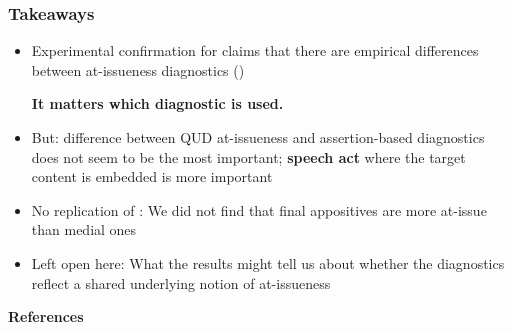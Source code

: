 \documentclass[compress, xcolor = dvipsnames, aspectratio=169]{beamer}
\begin{document}
	\begin{frame}\frametitle{Takeaways}
	
		\begin{itemize}[<+->]
			\item Experimental confirmation for claims that there are empirical differences between at-issueness diagnostics (\citealt{snider_anaphoric_2017,snider_at-issuenessne_2017,snider_distinguishing_2018,koev_notions_2018,faller_discourse_2019,korotkova_evidential_2020})
			\begin{center}
				\textbf{It matters which diagnostic is used.}\bigskip
			\end{center}


			\item But: difference between QUD at-issueness and assertion-based diagnostics does not seem to be the most important; \textbf{speech act} where the target content is embedded is more important \medskip

			\item No replication of \citealt{syrett_experimental_2015}: We did not find that final appositives are more at-issue than medial ones
			\medskip

			\item Left open here: What the results might tell us about whether the diagnostics reflect a shared underlying notion of at-issueness
		\end{itemize}

	
	\end{frame}



\begin{frame}[allowframebreaks]{\bfseries\opt References}
	\footnotesize
	
	

\end{frame}
\end{document}
